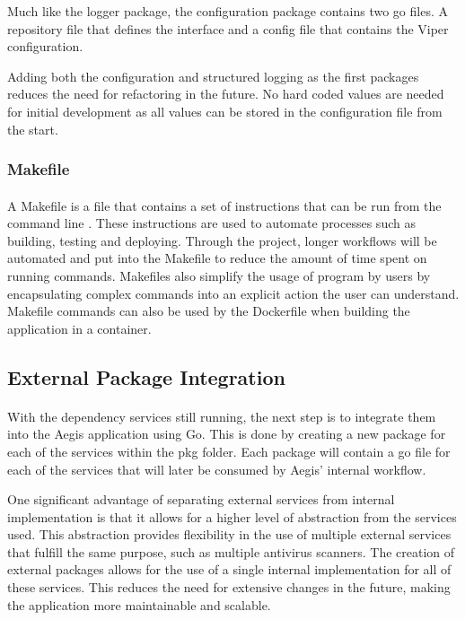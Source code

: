 \documentclass[12pt, conference, final, a4paper, onecolumn, compsoc]{IEEEtran}
\begin{document}
Much like the logger package, the configuration package contains two go files. A
repository file that defines the interface and a config file that contains the
Viper configuration.

Adding both the configuration and structured logging as the first packages
reduces the need for refactoring in the future. No hard coded values are needed
for initial development as all values can be stored in the configuration file
from the start.

\subsubsection*{Makefile}
\paragraph{}

A Makefile is a file that contains a set of instructions that can be run from
the command line \citep{makefile}. These instructions are used to automate processes such as
building, testing and deploying. Through the project, longer workflows will be
automated and put into the Makefile to reduce the amount of time spent on
running commands. Makefiles also simplify the usage of program by users by
encapsulating complex commands into an explicit action the user can understand.
Makefile commands can also be used by the Dockerfile when building the
application in a container.

\subsection{External Package Integration}
\paragraph{}

With the dependency services still running, the next step is to integrate them
into the Aegis application using Go. This is done by creating a new package for
each of the services within the pkg folder. Each package will contain a go file
for each of the services that will later be consumed by Aegis' internal
workflow.

One significant advantage of separating external services from internal
implementation is that it allows for a higher level of abstraction from the
services used. This abstraction provides flexibility in the use of multiple
external services that fulfill the same purpose, such as multiple antivirus
scanners. The creation of external packages allows for the use of a single
internal implementation for all of these services. This reduces the need for
extensive changes in the future, making the application more maintainable and
scalable.
\end{document}
